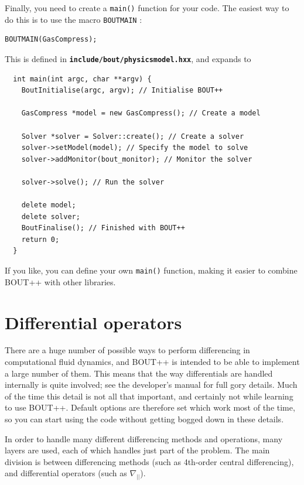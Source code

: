 \documentclass[12pt]{article}
\newcommand{\file}[1]{\texttt{\bf #1}}
\begin{document}
Finally, you need to create a
%
\lstinline!main()!
%
 function for your code. The easiest way to do this is to use the macro
%
\lstinline!BOUTMAIN!
%
:
%
\begin{lstlisting}
BOUTMAIN(GasCompress);
\end{lstlisting}
%
This is defined in \file{include/bout/physicsmodel.hxx}, and expands to
%
\begin{lstlisting}
  int main(int argc, char **argv) {
    BoutInitialise(argc, argv); // Initialise BOUT++

    GasCompress *model = new GasCompress(); // Create a model

    Solver *solver = Solver::create(); // Create a solver
    solver->setModel(model); // Specify the model to solve
    solver->addMonitor(bout_monitor); // Monitor the solver

    solver->solve(); // Run the solver

    delete model;
    delete solver;
    BoutFinalise(); // Finished with BOUT++
    return 0;
  }
\end{lstlisting}
%
If you like, you can define your own
%
\lstinline!main()!
%
 function, making it easier to combine BOUT++ with other libraries.





\section{Differential operators}
%
\label{sec:diffops}
%
There are a huge number of possible ways to perform differencing in
computational fluid dynamics, and BOUT++ is intended to be able to implement a
large number of them. This means that the way differentials are handled
internally is quite involved; see the developer's manual for full gory details.
Much of the time this detail is not all that important, and certainly not while
learning to use BOUT++. Default options are therefore set which work most of
the time, so you can start using the code without getting bogged down in these
details.

In order to handle many different differencing methods and operations, many
layers are used, each of which handles just part of the problem. The main
division is between differencing methods (such as 4th-order central
differencing), and differential operators (such as $\nabla_{||}$).
\end{document}
